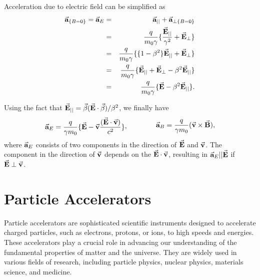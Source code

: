 \documentclass[a4paper,oneside,12pt]{report}
\numberwithin{equation}{chapter}
\begin{document}
Acceleration due to electric field can be simplified as
\vspace{-20pt}
\begin{eqnarray}
    \vec{\textbf{a}}_{\{B=0\}} = \vec{\textbf{a}}_{E}   &=&  \vec{\textbf{a}}_{||} + \vec{\textbf{a}}_{\perp \{B=0\}} \nonumber \\
                                &=& \frac{q}{m_0 \gamma} \{ \frac{\vec{\textbf{E}}_{||}}{\gamma^2} + \vec{\textbf{E}}_{\perp} \} \nonumber\\
                                &=& \frac{q}{m_0 \gamma} \{ \{1 - \beta^2\}\vec{\textbf{E}}_{||} + \vec{\textbf{E}}_{\perp} \} \nonumber\\
                                &=& \frac{q}{m_0 \gamma} \{ \vec{\textbf{E}}_{||} + \vec{\textbf{E}}_{\perp}-\beta^2\vec{\textbf{E}}_{||} \} \nonumber\\
                                &=& \frac{q}{m_0 \gamma} \{ \vec{\textbf{E}} - \beta^2\vec{\textbf{E}}_{||} \} .
\end{eqnarray}

\vspace{-27pt}
\noindent
Using the fact that $\vec{\textbf{E}}_{||} = \vec{\beta}(\vec{\textbf{E}} \cdot \vec{\beta})/\beta^2 $, we finally have
\vspace{-10pt}
\begin{equation} \label{eq:acc_of_E_and_B}
    \begin{aligned}
        \vecthreeBF{a}_{E} = \frac{q}{ \gamma m_0} \{ \vecthreeBF{E} - \vecthreeBF{v}\frac{(\dotProdBF{E}{v})}{c^2} \}
    \end{aligned}  ,
    \qquad \qquad
    \begin{aligned}
        \vecthreeBF{a}_{B} = \frac{q}{\gamma m_0} ( \crossProdBF{v}{B} ) ,
    \end{aligned}
    \vspace{-12pt}
\end{equation}
where $\vec{\textbf{a}}_{E}$ consists of two components in the direction of $\vec{\textbf{E}}$ and $\vec{\textbf{v}}$.
The component in the direction of $\vec{\textbf{v}}$ depends on the $\vec{\textbf{E}} \cdot \vec{\textbf{v}}$, 
resulting in $\vec{\textbf{a}}_{E} || \vec{\textbf{E}}$ if $\vec{\textbf{E}} \perp \vec{\textbf{v}}$.


\section{Particle Accelerators}

Particle accelerators are sophisticated scientific instruments designed to accelerate charged particles, such as electrons, protons, or ions, to high speeds and energies. 
These accelerators play a crucial role in advancing our understanding of the fundamental properties of matter and the universe. 
They are widely used in various fields of research, including particle physics, nuclear physics, materials science, and medicine.
\end{document}
